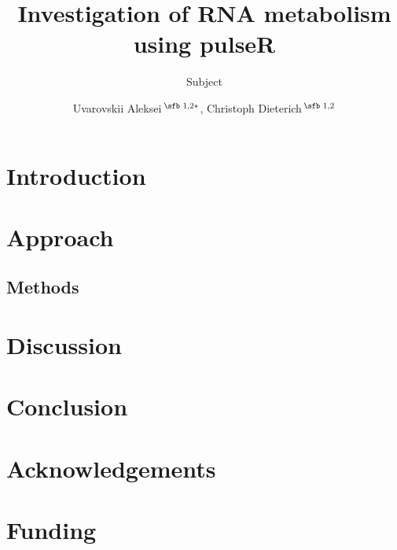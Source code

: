 \documentclass{bioinfo}
\begin{document}

\subtitle{Subject}

\title[pulseR package]{Investigation of RNA metabolism using pulseR}
\author[Uvarovskii \textit{et~al}.]{
Uvarovskii Aleksei\,$^{\text{\sfb 1,2}*}$,
Christoph Dieterich\,$^{\text{\sfb 1,2}}$ }
\address{$^{\text{\sf 1}}$
Section of Bioinformatics and Systems Cardiology
Klaus Tschira Institute for Integrative Computational Cardiology
Department of Internal Medicine III
University Hospital Heidelberg,   
Im Neuenheimer Feld 669
69120 Heidelberg,
and 
$^{\text{\sf 2}}$
German Center for Cardiovascular Research (DZHK),
Im Neuenheimer Feld 669
69120 Heidelberg
}




\maketitle

\section{Introduction}

\section{Approach}

\begin{methods}
\section{Methods}
\end{methods}

\section{Discussion}

\section{Conclusion}

\section*{Acknowledgements}

\section*{Funding}

%
%
%
%
%
%

%

\end{document}
